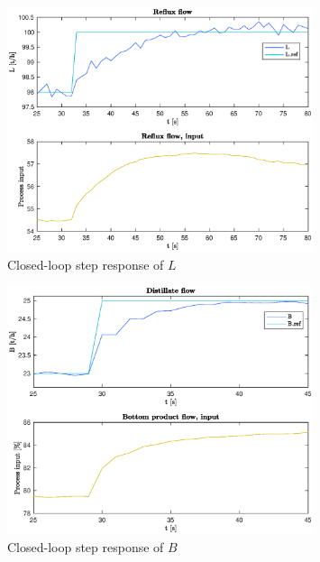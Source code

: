 \documentclass[12pt]{article}
\begin{document}
\begin{figure}[p]
\centering
\includegraphics[width=0.8\textwidth]{../Systemanalyse/Log_Data_to_Matlab/Figurer/Stegeksperimenter/FC1015_step.eps}
\caption{Closed-loop step response of $L$}
\label{fig:cl_step_FC1015}
\end{figure}

\begin{figure}[p]
\centering
\includegraphics[width=0.8\textwidth]{../Systemanalyse/Log_Data_to_Matlab/Figurer/Stegeksperimenter/FC1019_step.eps}
\caption{Closed-loop step response of $B$}
\label{fig:cl_step_FC1019}
\end{figure}
\end{document}
